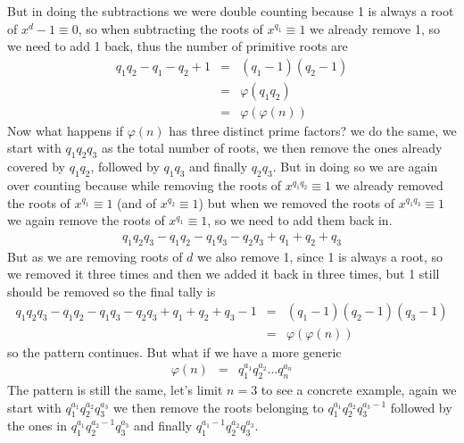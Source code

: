 \documentclass[aps,preprint,preprintnumbers,nofootinbib,showpacs,prd]{revtex4-1}
\newcommand{\nbea}{\begin{eqnarray*}}
\newcommand{\neea}{\end{eqnarray*}}
\begin{document}
But in doing the subtractions we were double counting because 1 is always a root of $x^d - 1 \equiv 0$, so when subtracting the roots of $x^{q_1} \equiv 1$ we already remove 1, so we need to add 1 back, thus the number of primitive roots are
%
\nbea
q_1q_2 - q_1 - q_2 + 1 & = & (q_1 - 1)(q_2 - 1) \\
& = & \varphi(q_1q_2) \\
& = & \varphi(\varphi(n))
\neea
%
Now what happens if $\varphi(n)$ has three distinct prime factors? we do the same, we start with $q_1q_2q_3$ as the total number of roots, we then remove the ones already covered by $q_1q_2$, followed by $q_1q_3$ and finally $q_2q_3$. But in doing so we are again over counting because while removing the roots of $x^{q_1q_2} \equiv 1$ we already removed the roots of $x^{q_1} \equiv 1$ (and of $x^{q_2} \equiv 1$) but when we removed the roots of $x^{q_1q_3} \equiv 1$ we again remove the roots of $x^{q_1} \equiv 1$, so we need to add them back in.
%
\nbea
q_1q_2q_3 - q_1q_2 - q_1q_3 - q_2q_3 + q_1 + q_2 + q_3
\neea
%
But as we are removing roots of $d$ we also remove 1, since 1 is always a root, so we removed it three times and then we added it back in three times, but 1 still should be removed so the final tally is
%
\nbea
q_1q_2q_3 - q_1q_2 - q_1q_3 - q_2q_3 + q_1 + q_2 + q_3 - 1 & = & (q_1 - 1)(q_2 - 1)(q_3 - 1) \\
& = & \varphi(\varphi(n))
\neea
%
so the pattern continues. But what if we have a more generic
%
\nbea
\varphi(n) & = & q_1^{a_1}q_2^{a_2} \dots q_n^{a_n}
\neea
%
The pattern is still the same, let's limit $n=3$ to see a concrete example, again we start with $q_1^{a_1}q_2^{a_2}q_3^{a_3}$ we then remove the roots belonging to $q_1^{a_1}q_2^{a_2}q_3^{a_3-1}$ followed by the ones in $q_1^{a_1}q_2^{a_2-1}q_3^{a_3}$ and finally $q_1^{a_1-1}q_2^{a_2}q_3^{a_3}$.
\end{document}

